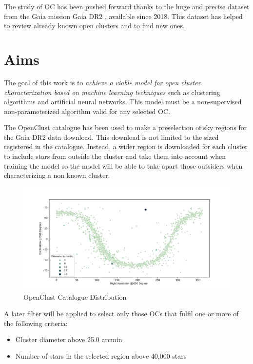 \documentclass[11pt, a4paper, english]{book}
\begin{document}
The study of OC has been pushed forward thanks to the huge and precise dataset from the Gaia mission
\cite[]{collaboration2016description} Gaia DR2 \cite[]{gaia2018gaia}, available since 2018.
This dataset has helped to review already known open clusters and to find new ones.

\section{Aims}

The goal of this work is to \emph{achieve a viable model for open cluster characterization based on machine learning techniques}
such as clustering algorithms and artificial neural networks.
This model must be a non-supervised non-parameterized algorithm valid for any selected OC.

The OpenClust catalogue \cite[]{dias2002new} has been used to make a preselection of sky regions for the Gaia DR2 data download.
This download is not limited to the sized registered in the catalogue. Instead, a wider region is downloaded for each cluster to include
stars from outside the cluster and take them into account when training the model so the model will be able to take apart those outsiders
when characterizing a non known cluster.

\begin{figure}[htbp]
  \centering
  \includegraphics[width=\columnwidth]{../figures/openclust_catalogue.pdf}
  \caption{OpenClust Catalogue Distribution}
\end{figure}

A later filter will be applied to select only those OCs that fulfil one or more of the following criteria:

\begin{itemize}
  \item Cluster diameter above 25.0 arcmin
  \item Number of stars in the selected region above 40,000 stars
\end{itemize}
\end{document}

